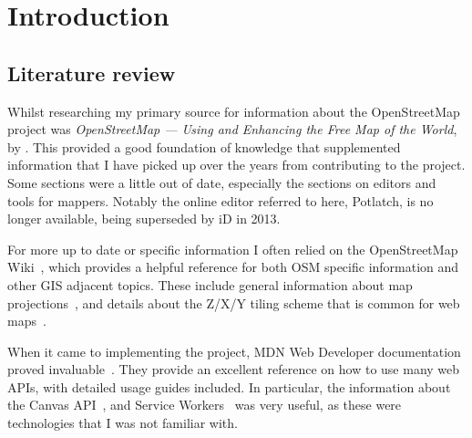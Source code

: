 \documentclass{final_report}
\begin{document}


\chapter{Introduction}




\section{Literature review}

Whilst researching my primary source for information about the OpenStreetMap project was \emph{OpenStreetMap — Using and Enhancing the Free Map of the World}, by \textcite{RAMM:2011}. This provided a good foundation of knowledge that supplemented information that I have picked up over the years from contributing to the project. Some sections were a little out of date, especially the sections on editors and tools for mappers. Notably the online editor referred to here, Potlatch, is no longer available, being superseded by iD in 2013.

For more up to date or specific information I often relied on the OpenStreetMap Wiki~\cite{osm-wiki}, which provides a helpful reference for both OSM specific information and other GIS adjacent topics. These include general information about map projections~\cite{osm-wiki-mercator}, and details about the Z/X/Y tiling scheme that is common for web maps~\cite{osm-wiki-tile-names}.

When it came to implementing the project, MDN Web Developer documentation proved invaluable~\cite{mdn}. They provide an excellent reference on how to use many web APIs, with detailed usage guides included. In particular, the information about the Canvas API~\cite{mdn-canvas-api}, and Service Workers~\cite{mdn-service-workers} was very useful, as these were technologies that I was not familiar with.
\end{document}

